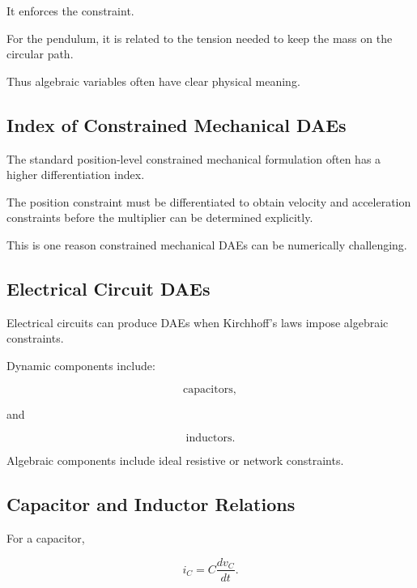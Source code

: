 It enforces the constraint.

For the pendulum, it is related to the tension needed to keep the mass on
the circular path.

Thus algebraic variables often have clear physical meaning.

\subsection{Index of Constrained Mechanical DAEs}
\label{subsec:mechanical-dae-index}

The standard position-level constrained mechanical formulation often has
a higher differentiation index.

The position constraint must be differentiated to obtain velocity and
acceleration constraints before the multiplier can be determined
explicitly.

This is one reason constrained mechanical DAEs can be numerically
challenging.

\subsection{Electrical Circuit DAEs}
\label{subsec:electrical-circuit-daes}

Electrical circuits can produce DAEs when Kirchhoff's laws impose
algebraic constraints.

Dynamic components include:

\[
\boxed{
\text{capacitors},
}
\]

and

\[
\boxed{
\text{inductors}.
}
\]

Algebraic components include ideal resistive or network constraints.

\subsection{Capacitor and Inductor Relations}
\label{subsec:capacitor-inductor-dae}

For a capacitor,

\[
\boxed{
i_C
=
C
\frac{dv_C}{dt}.
}
\]

